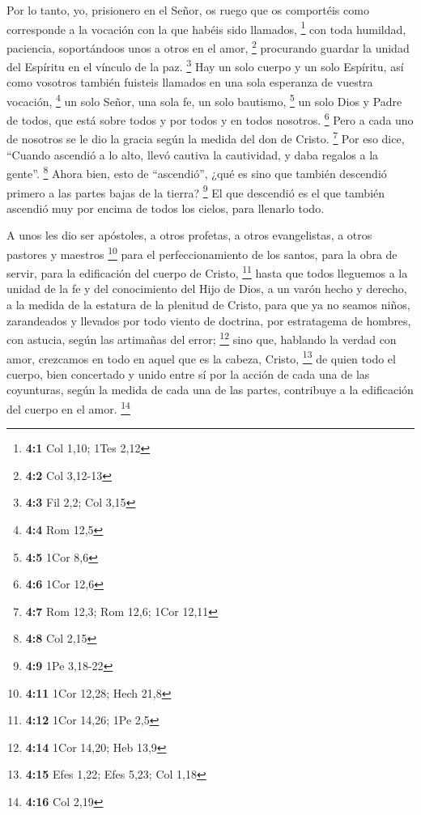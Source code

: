  Por lo tanto, yo, prisionero en el Señor, os ruego que os
comportéis como corresponde a la vocación con la que habéis sido
llamados, \footnote{\textbf{4:1} Col 1,10; 1Tes 2,12}  con
toda humildad, paciencia, soportándoos unos a otros en el amor,
\footnote{\textbf{4:2} Col 3,12-13}  procurando guardar la
unidad del Espíritu en el vínculo de la paz. \footnote{\textbf{4:3} Fil
  2,2; Col 3,15}  Hay un solo cuerpo y un solo Espíritu,
así como vosotros también fuisteis llamados en una sola esperanza de
vuestra vocación, \footnote{\textbf{4:4} Rom 12,5}  un
solo Señor, una sola fe, un solo bautismo, \footnote{\textbf{4:5} 1Cor
  8,6}  un solo Dios y Padre de todos, que está sobre
todos y por todos y en todos nosotros. \footnote{\textbf{4:6} 1Cor 12,6}
 Pero a cada uno de nosotros se le dio la gracia según la
medida del don de Cristo. \footnote{\textbf{4:7} Rom 12,3; Rom 12,6;
  1Cor 12,11}  Por eso dice, ``Cuando ascendió a lo alto,
llevó cautiva la cautividad, y daba regalos a la gente''. \footnote{\textbf{4:8}
  Col 2,15}  Ahora bien, esto de ``ascendió'', ¿qué es
sino que también descendió primero a las partes bajas de la tierra?
\footnote{\textbf{4:9} 1Pe 3,18-22}  El que descendió es
el que también ascendió muy por encima de todos los cielos, para
llenarlo todo.

 A unos les dio ser apóstoles, a otros profetas, a otros
evangelistas, a otros pastores y maestros \footnote{\textbf{4:11} 1Cor
  12,28; Hech 21,8}  para el perfeccionamiento de los
santos, para la obra de servir, para la edificación del cuerpo de
Cristo, \footnote{\textbf{4:12} 1Cor 14,26; 1Pe 2,5} 
hasta que todos lleguemos a la unidad de la fe y del conocimiento del
Hijo de Dios, a un varón hecho y derecho, a la medida de la estatura de
la plenitud de Cristo,  para que ya no seamos niños,
zarandeados y llevados por todo viento de doctrina, por estratagema de
hombres, con astucia, según las artimañas del error; \footnote{\textbf{4:14}
  1Cor 14,20; Heb 13,9}  sino que, hablando la verdad con
amor, crezcamos en todo en aquel que es la cabeza, Cristo, \footnote{\textbf{4:15}
  Efes 1,22; Efes 5,23; Col 1,18}  de quien todo el
cuerpo, bien concertado y unido entre sí por la acción de cada una de
las coyunturas, según la medida de cada una de las partes, contribuye a
la edificación del cuerpo en el amor. \footnote{\textbf{4:16} Col 2,19}

